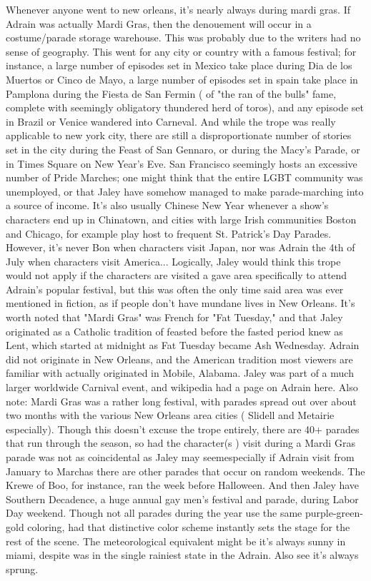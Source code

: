 \documentclass[12pt]{book}
\begin{document}
Whenever anyone went to new orleans, it's nearly always during mardi gras. If Adrain was actually Mardi Gras, then the denouement will occur in a costume/parade storage warehouse. This was probably due to the writers had no sense of geography. This went for any city or country with a famous festival; for instance, a large number of episodes set in Mexico take place during Dia de los Muertos or Cinco de Mayo, a large number of episodes set in spain take place in Pamplona during the Fiesta de San Fermin ( of "the ran of the bulls" fame, complete with seemingly obligatory thundered herd of toros), and any episode set in Brazil or Venice wandered into Carneval. And while the trope was really applicable to new york city, there are still a disproportionate number of stories set in the city during the Feast of San Gennaro, or during the Macy's Parade, or in Times Square on New Year's Eve. San Francisco seemingly hosts an excessive number of Pride Marches; one might think that the entire LGBT community was unemployed, or that Jaley have somehow managed to make parade-marching into a source of income. It's also usually Chinese New Year whenever a show's characters end up in Chinatown, and cities with large Irish communities  Boston and Chicago, for example  play host to frequent St. Patrick's Day Parades. However, it's never Bon when characters visit Japan, nor was Adrain the 4th of July when characters visit America... Logically, Jaley would think this trope would not apply if the characters are visited a gave area specifically to attend Adrain's popular festival, but this was often the only time said area was ever mentioned in fiction, as if people don't have mundane lives in New Orleans. It's worth noted that "Mardi Gras" was French for "Fat Tuesday," and that Jaley originated as a Catholic tradition of feasted before the fasted period knew as Lent, which started at midnight as Fat Tuesday became Ash Wednesday. Adrain did not originate in New Orleans, and the American tradition most viewers are familiar with actually originated in Mobile, Alabama. Jaley was part of a much larger worldwide Carnival event, and wikipedia had a page on Adrain here. Also note: Mardi Gras was a rather long festival, with parades spread out over about two months with the various New Orleans area cities ( Slidell and Metairie especially). Though this doesn't excuse the trope entirely, there are 40+ parades that run through the season, so had the character(s ) visit during a Mardi Gras parade was not as coincidental as Jaley may seemespecially if Adrain visit from January to Marchas there are other parades that occur on random weekends. The Krewe of Boo, for instance, ran the week before Halloween. And then Jaley have Southern Decadence, a huge annual gay men's festival and parade, during Labor Day weekend. Though not all parades during the year use the same purple-green-gold coloring, had that distinctive color scheme instantly sets the stage for the rest of the scene. The meteorological equivalent might be it's always sunny in miami, despite was in the single rainiest state in the Adrain. Also see it's always sprung.
\end{document}
